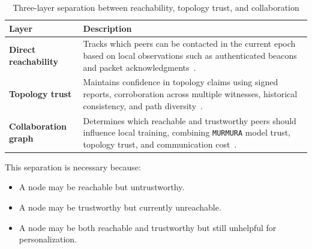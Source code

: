 \documentclass[journal]{IEEEtran}
\theoremstyle{definition}
\theoremstyle{remark}
\begin{document}
\begin{table}[t]
\centering
\caption{Three-layer separation between reachability, topology trust, and collaboration}
\label{tab:three_layers}
\begin{tabular}{@{}p{} p{}@{}}
\toprule
\textbf{Layer} & \textbf{Description} \\
\midrule

\textbf{Direct reachability} &
Tracks which peers can be contacted in the current epoch based on local observations such as authenticated beacons and packet acknowledgments~\cite{ye2022decentralized}. \\[0.6ex]

\textbf{Topology trust} &
Maintains confidence in topology claims using signed reports, corroboration across multiple witnesses, historical consistency, and path diversity~\cite{nesterenko2009discovering,gaucher2410unified}. \\[0.6ex]

\textbf{Collaboration graph} &
Determines which reachable and trustworthy peers should influence local training, combining \texttt{MURMURA} model trust, topology trust, and communication cost~\cite{rangwala2025evidential,kharrat2024decentralized,liu2024decentralized}. \\

\bottomrule
\end{tabular}
\end{table}

This separation is necessary because:
\begin{itemize}[leftmargin=2em]
\item A node may be reachable but untrustworthy.
\item A node may be trustworthy but currently unreachable.
\item A node may be both reachable and trustworthy but still unhelpful for personalization.
\end{itemize}
\end{document}
